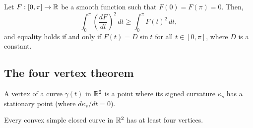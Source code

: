 \begin{proposition}
  Let $F: [0, \pi] \to \mathbb{R}$ be a smooth function such that $F(0) = F(\pi) = 0$. Then,
  \[
    \int_0^{\pi} \left(\frac{dF}{dt}\right)^2 \, dt
    \geq
    \int_0^{\pi} F(t)^2 \, dt,
  \]
  and equality holds if and only if $F(t) = D \sin t$
  for all $t \in [0, \pi]$, where $D$ is a constant.
\end{proposition}

\subsection{The four vertex theorem}

\begin{defn}
  A vertex of a curve $\gamma(t)$ in $\mathbb{R}^2$ is a point where its signed curvature $\kappa_s$
  has a stationary point (where $d\kappa_s / dt = 0$).
\end{defn}

\begin{theorem}
  Every convex simple closed curve in $\mathbb{R}^2$ has at least four vertices.
\end{theorem}